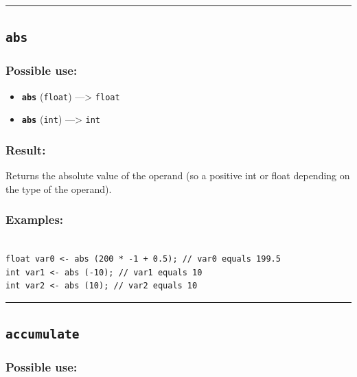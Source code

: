 \documentclass[]{book}
\providecommand{\tightlist}{%
  \setlength{\itemsep}{0pt}\setlength{\parskip}{0pt}}
\theoremstyle{definition}
\theoremstyle{definition}
\theoremstyle{definition}
\theoremstyle{remark}
\begin{document}
\begin{center}\rule{0.5\linewidth}{\linethickness}\end{center}

\subsection{\texorpdfstring{\texttt{abs}}{abs}}\label{abs}

\subsubsection{Possible use:}\label{possible-use-16}

\begin{itemize}
\tightlist
\item
  \textbf{\texttt{abs}} (\texttt{float}) ---\textgreater{}
  \texttt{float}
\item
  \textbf{\texttt{abs}} (\texttt{int}) ---\textgreater{} \texttt{int}
\end{itemize}

\subsubsection{Result:}\label{result-15}

Returns the absolute value of the operand (so a positive int or float
depending on the type of the operand).

\subsubsection{Examples:}\label{examples-12}

\begin{verbatim}
 
float var0 <- abs (200 * -1 + 0.5); // var0 equals 199.5 
int var1 <- abs (-10); // var1 equals 10 
int var2 <- abs (10); // var2 equals 10
\end{verbatim}

\begin{center}\rule{0.5\linewidth}{\linethickness}\end{center}

\subsection{\texorpdfstring{\texttt{accumulate}}{accumulate}}\label{accumulate}

\subsubsection{Possible use:}\label{possible-use-17}
\end{document}
